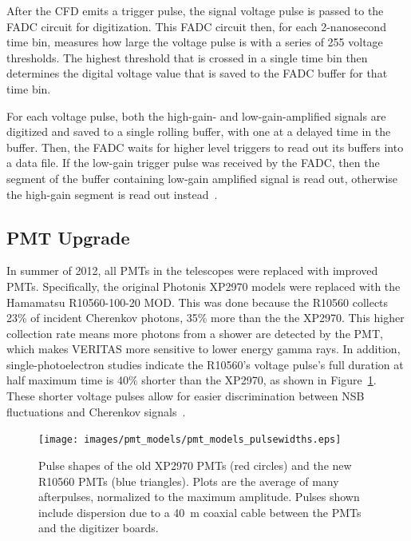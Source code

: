 After the CFD emits a trigger pulse, the signal voltage pulse is passed to the FADC circuit for digitization.
This FADC circuit then, for each 2-nanosecond time bin, measures how large the voltage pulse is with a series of 255 voltage thresholds.
The highest threshold that is crossed in a single time bin then determines the digital voltage value that is saved to the FADC buffer for that time bin.

For each voltage pulse, both the high-gain- and low-gain-amplified signals are digitized and saved to a single rolling buffer, with one at a delayed time in the buffer.
Then, the FADC waits for higher level triggers to read out its buffers into a data file.
If the low-gain trigger pulse was received by the FADC, then the segment of the buffer containing low-gain amplified signal is read out, otherwise the high-gain segment is read out instead~\cite{Veritas_Detector,veritas_FADC}.

\subsection{PMT Upgrade}
In summer of 2012, all PMTs in the telescopes were replaced with improved PMTs.
Specifically, the original Photonis XP2970 models were replaced with the Hamamatsu R10560-100-20 MOD.
This was done because the R10560 collects 23\% of incident Cherenkov photons, 35\% more than the the XP2970.
This higher collection rate means more photons from a shower are detected by the PMT, which makes VERITAS more sensitive to lower energy gamma rays.
In addition, single-photoelectron studies indicate the R10560's voltage pulse's full duration at half maximum time is \nicetilde{}40\% shorter than the XP2970, as shown in Figure~\ref{fig:pmt_pulse_widths}.
These shorter voltage pulses allow for easier discrimination between NSB fluctuations and Cherenkov signals~\cite{pmtmodels}.

\begin{figure}[ht]
  \centering
  \texttt{[image: images/pmt\_models/pmt\_models\_pulsewidths.eps]}
  \caption[Pulse Shapes]{
    Pulse shapes of the old XP2970 PMTs (red circles) and the new R10560 PMTs (blue triangles).
    Plots are the average of many afterpulses, normalized to the maximum amplitude.
    Pulses shown include dispersion due to a \nicetilde{}\SI{40}{m} coaxial cable between the PMTs and the digitizer boards.~\cite{pmtmodels}}
  \label{fig:pmt_pulse_widths}
\end{figure}

